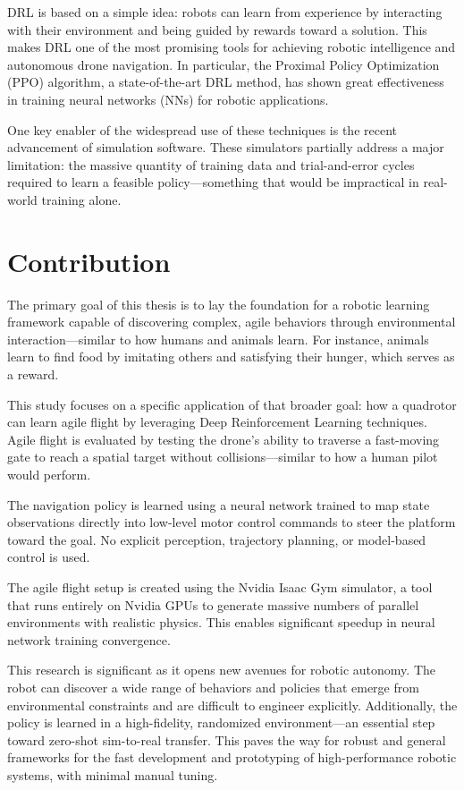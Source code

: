 \documentclass[a4paper,oneside]{book}
\theoremstyle{definition}
\begin{document}
DRL is based on a simple idea: robots can learn from experience by interacting with their environment and being guided by rewards toward a solution. This makes DRL one of the most promising tools for achieving robotic intelligence and autonomous drone navigation. In particular, the Proximal Policy Optimization (PPO) algorithm, a state-of-the-art DRL method, has shown great effectiveness in training neural networks (NNs) for robotic applications.

One key enabler of the widespread use of these techniques is the recent advancement of simulation software. These simulators partially address a major limitation: the massive quantity of training data and trial-and-error cycles required to learn a feasible policy—something that would be impractical in real-world training alone.

\section*{Contribution}

The primary goal of this thesis is to lay the foundation for a robotic learning framework capable of discovering complex, agile behaviors through environmental interaction—similar to how humans and animals learn. For instance, animals learn to find food by imitating others and satisfying their hunger, which serves as a reward.

This study focuses on a specific application of that broader goal: how a quadrotor can learn agile flight by leveraging Deep Reinforcement Learning techniques. Agile flight is evaluated by testing the drone's ability to traverse a fast-moving gate to reach a spatial target without collisions—similar to how a human pilot would perform.

The navigation policy is learned using a neural network trained to map state observations directly into low-level motor control commands to steer the platform toward the goal. No explicit perception, trajectory planning, or model-based control is used.

The agile flight setup is created using the Nvidia Isaac Gym simulator, a tool that runs entirely on Nvidia GPUs to generate massive numbers of parallel environments with realistic physics. This enables significant speedup in neural network training convergence.

This research is significant as it opens new avenues for robotic autonomy. The robot can discover a wide range of behaviors and policies that emerge from environmental constraints and are difficult to engineer explicitly. Additionally, the policy is learned in a high-fidelity, randomized environment—an essential step toward zero-shot sim-to-real transfer. This paves the way for robust and general frameworks for the fast development and prototyping of high-performance robotic systems, with minimal manual tuning.
\end{document}
